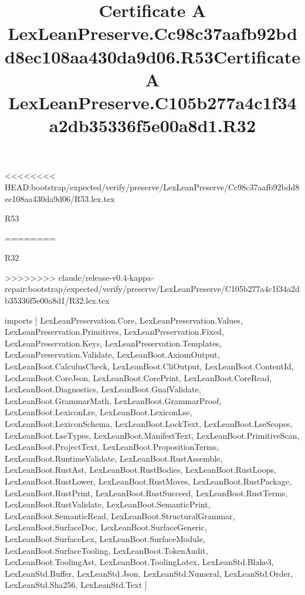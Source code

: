 <<<<<<<< HEAD:bootstrap/expected/verify/preserve/LexLeanPreserve/Cc98c37aafb92bdd8ec108aa430da9d06/R53.lex.tex
\begin{lexlean}{R53}
\title{Certificate A LexLeanPreserve.Cc98c37aafb92bdd8ec108aa430da9d06.R53}
========
\begin{lexlean}{R32}
\title{Certificate A LexLeanPreserve.C105b277a4c1f34a2db35336f5e00a8d1.R32}
>>>>>>>> claude/release-v0.4-kappa-repair:bootstrap/expected/verify/preserve/LexLeanPreserve/C105b277a4c1f34a2db35336f5e00a8d1/R32.lex.tex
\begin{coremodule}
imports [
  LexLeanPreservation.Core,
  LexLeanPreservation.Values,
  LexLeanPreservation.Primitives,
  LexLeanPreservation.Fixed,
  LexLeanPreservation.Keys,
  LexLeanPreservation.Templates,
  LexLeanPreservation.Validate,
  LexLeanBoot.AxiomOutput,
  LexLeanBoot.CalculusCheck,
  LexLeanBoot.CliOutput,
  LexLeanBoot.ContentId,
  LexLeanBoot.CoreJson,
  LexLeanBoot.CorePrint,
  LexLeanBoot.CoreRead,
  LexLeanBoot.Diagnostics,
  LexLeanBoot.GnafValidate,
  LexLeanBoot.GrammarMath,
  LexLeanBoot.GrammarProof,
  LexLeanBoot.LexiconLre,
  LexLeanBoot.LexiconLse,
  LexLeanBoot.LexiconSchema,
  LexLeanBoot.LockText,
  LexLeanBoot.LseScopes,
  LexLeanBoot.LseTypes,
  LexLeanBoot.ManifestText,
  LexLeanBoot.PrimitiveScan,
  LexLeanBoot.ProjectText,
  LexLeanBoot.PropositionTerms,
  LexLeanBoot.RuntimeValidate,
  LexLeanBoot.RustAssemble,
  LexLeanBoot.RustAst,
  LexLeanBoot.RustBodies,
  LexLeanBoot.RustLoops,
  LexLeanBoot.RustLower,
  LexLeanBoot.RustMoves,
  LexLeanBoot.RustPackage,
  LexLeanBoot.RustPrint,
  LexLeanBoot.RustSucceed,
  LexLeanBoot.RustTerms,
  LexLeanBoot.RustValidate,
  LexLeanBoot.SemanticPrint,
  LexLeanBoot.SemanticRead,
  LexLeanBoot.StructuralGrammar,
  LexLeanBoot.SurfaceDoc,
  LexLeanBoot.SurfaceGeneric,
  LexLeanBoot.SurfaceLex,
  LexLeanBoot.SurfaceModule,
  LexLeanBoot.SurfaceTooling,
  LexLeanBoot.TokenAudit,
  LexLeanBoot.ToolingAst,
  LexLeanBoot.ToolingLatex,
  LexLeanStd.Blake3,
  LexLeanStd.Buffer,
  LexLeanStd.Json,
  LexLeanStd.Numeral,
  LexLeanStd.Order,
  LexLeanStd.Sha256,
  LexLeanStd.Text
]


\end{coremodule}
\end{lexlean}
\end{lexlean}

